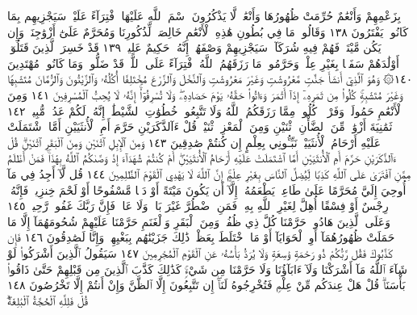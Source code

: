 بِزَعْمِهِمْ وَأَنْعَٰمٌ حُرِّمَتْ ظُهُورُهَا وَأَنْعَٰمࣱ لَّا يَذْكُرُونَ
ٱسْمَ ٱللَّهِ عَلَيْهَا ٱفْتِرَآءً عَلَيْهِۚ سَيَجْزِيهِم بِمَا كَانُوا۟
يَفْتَرُونَ ١٣٨ وَقَالُوا۟ مَا فِي بُطُونِ هَٰذِهِ ٱلْأَنْعَٰمِ خَالِصَةࣱ
لِّذُكُورِنَا وَمُحَرَّمٌ عَلَىٰٓ أَزْوَٰجِنَاۖ وَإِن يَكُن مَّيْتَةࣰ
فَهُمْ فِيهِ شُرَكَآءُۚ سَيَجْزِيهِمْ وَصْفَهُمْۚ إِنَّهُۥ حَكِيمٌ
عَلِيمࣱ ١٣٩ قَدْ خَسِرَ ٱلَّذِينَ قَتَلُوٓا۟ أَوْلَٰدَهُمْ سَفَهَۢا بِغَيْرِ
عِلْمࣲ وَحَرَّمُوا۟ مَا رَزَقَهُمُ ٱللَّهُ ٱفْتِرَآءً عَلَى ٱللَّهِۚ قَدْ ضَلُّوا۟
وَمَا كَانُوا۟ مُهْتَدِينَ ١٤٠۞ وَهُوَ ٱلَّذِيٓ أَنشَأَ جَنَّٰتࣲ
مَّعْرُوشَٰتࣲ وَغَيْرَ مَعْرُوشَٰتࣲ وَٱلنَّخْلَ وَٱلزَّرْعَ مُخْتَلِفًا
أُكُلُهُۥ وَٱلزَّيْتُونَ وَٱلرُّمَّانَ مُتَشَٰبِهࣰا وَغَيْرَ مُتَشَٰبِهࣲۚ
كُلُوا۟ مِن ثَمَرِهِۦٓ إِذَآ أَثْمَرَ وَءَاتُوا۟ حَقَّهُۥ يَوْمَ حَصَادِهِۦۖ
وَلَا تُسْرِفُوٓا۟ۚ إِنَّهُۥ لَا يُحِبُّ ٱلْمُسْرِفِينَ ١٤١ وَمِنَ ٱلْأَنْعَٰمِ
حَمُولَةࣰ وَفَرْشࣰاۚ كُلُوا۟ مِمَّا رَزَقَكُمُ ٱللَّهُ وَلَا تَتَّبِعُوا۟
خُطُوَٰتِ ٱلشَّيْطَٰنِۚ إِنَّهُۥ لَكُمْ عَدُوࣱّ مُّبِينࣱ ١٤٢
ثَمَٰنِيَةَ أَزْوَٰجࣲۖ مِّنَ ٱلضَّأْنِ ٱثْنَيْنِ وَمِنَ ٱلْمَعْزِ ٱثْنَيْنِۗ
قُلْ ءَآلذَّكَرَيْنِ حَرَّمَ أَمِ ٱلْأُنثَيَيْنِ أَمَّا ٱشْتَمَلَتْ عَلَيْهِ
أَرْحَامُ ٱلْأُنثَيَيْنِۖ نَبِّـُٔونِي بِعِلْمٍ إِن كُنتُمْ صَٰدِقِينَ ١٤٣
وَمِنَ ٱلْإِبِلِ ٱثْنَيْنِ وَمِنَ ٱلْبَقَرِ ٱثْنَيْنِۗ قُلْ ءَآلذَّكَرَيْنِ
حَرَّمَ أَمِ ٱلْأُنثَيَيْنِ أَمَّا ٱشْتَمَلَتْ عَلَيْهِ أَرْحَامُ ٱلْأُنثَيَيْنِۖ
أَمْ كُنتُمْ شُهَدَآءَ إِذْ وَصَّىٰكُمُ ٱللَّهُ بِهَٰذَاۚ فَمَنْ
أَظْلَمُ مِمَّنِ ٱفْتَرَىٰ عَلَى ٱللَّهِ كَذِبࣰا لِّيُضِلَّ ٱلنَّاسَ بِغَيْرِ
عِلْمٍۚ إِنَّ ٱللَّهَ لَا يَهْدِي ٱلْقَوْمَ ٱلظَّٰلِمِينَ ١٤٤ قُل لَّآ أَجِدُ
فِي مَآ أُوحِيَ إِلَيَّ مُحَرَّمًا عَلَىٰ طَاعِمࣲ يَطْعَمُهُۥٓ إِلَّآ أَن يَكُونَ
مَيْتَةً أَوْ دَمࣰا مَّسْفُوحًا أَوْ لَحْمَ خِنزِيرࣲ فَإِنَّهُۥ رِجْسٌ أَوْ
فِسْقًا أُهِلَّ لِغَيْرِ ٱللَّهِ بِهِۦۚ فَمَنِ ٱضْطُرَّ غَيْرَ بَاغࣲ وَلَا عَادࣲ
فَإِنَّ رَبَّكَ غَفُورࣱ رَّحِيمࣱ ١٤٥ وَعَلَى ٱلَّذِينَ هَادُوا۟ حَرَّمْنَا
كُلَّ ذِي ظُفُرࣲۖ وَمِنَ ٱلْبَقَرِ وَٱلْغَنَمِ حَرَّمْنَا عَلَيْهِمْ
شُحُومَهُمَآ إِلَّا مَا حَمَلَتْ ظُهُورُهُمَآ أَوِ ٱلْحَوَايَآ أَوْ مَا ٱخْتَلَطَ
بِعَظْمࣲۚ ذَٰلِكَ جَزَيْنَٰهُم بِبَغْيِهِمْۖ وَإِنَّا لَصَٰدِقُونَ ١٤٦
فَإِن كَذَّبُوكَ فَقُل رَّبُّكُمْ ذُو رَحْمَةࣲ وَٰسِعَةࣲ وَلَا يُرَدُّ
بَأْسُهُۥ عَنِ ٱلْقَوْمِ ٱلْمُجْرِمِينَ ١٤٧ سَيَقُولُ ٱلَّذِينَ أَشْرَكُوا۟
لَوْ شَآءَ ٱللَّهُ مَآ أَشْرَكْنَا وَلَآ ءَابَآؤُنَا وَلَا حَرَّمْنَا مِن شَيْءࣲۚ
كَذَٰلِكَ كَذَّبَ ٱلَّذِينَ مِن قَبْلِهِمْ حَتَّىٰ ذَاقُوا۟ بَأْسَنَاۗ
قُلْ هَلْ عِندَكُم مِّنْ عِلْمࣲ فَتُخْرِجُوهُ لَنَآۖ إِن تَتَّبِعُونَ إِلَّا
ٱلظَّنَّ وَإِنْ أَنتُمْ إِلَّا تَخْرُصُونَ ١٤٨ قُلْ فَلِلَّهِ ٱلْحُجَّةُ ٱلْبَٰلِغَةُۖ
